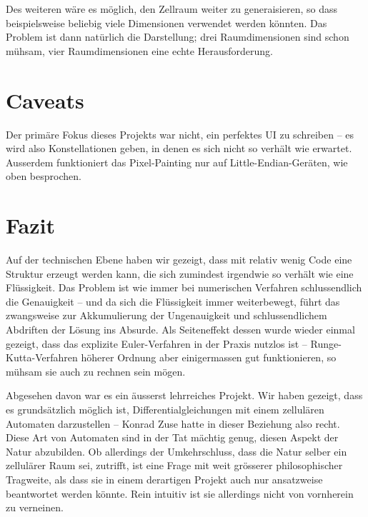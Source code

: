 \documentclass[11pt]{scrreprt} %
\theoremstyle{definition}
\begin{document}
Des weiteren wäre es möglich, den Zellraum weiter zu generaisieren, so dass beispielsweise beliebig viele Dimensionen verwendet werden könnten. Das Problem ist dann natürlich die Darstellung; drei Raumdimensionen sind schon mühsam, vier Raumdimensionen eine echte Herausforderung.

\section{Caveats}

Der primäre Fokus dieses Projekts war nicht, ein perfektes UI zu schreiben -- es wird also Konstellationen geben, in denen es sich nicht so verhält wie erwartet. Ausserdem funktioniert das Pixel-Painting nur auf Little-Endian-Geräten, wie oben besprochen.

\section{Fazit}

Auf der technischen Ebene haben wir gezeigt, dass mit relativ wenig Code eine Struktur erzeugt werden kann, die sich zumindest irgendwie so verhält wie eine Flüssigkeit. Das Problem ist wie immer bei numerischen Verfahren schlussendlich die Genauigkeit -- und da sich die Flüssigkeit immer weiterbewegt, führt das zwangsweise zur Akkumulierung der Ungenauigkeit und schlussendlichem Abdriften der Lösung ins Absurde. Als Seiteneffekt dessen wurde wieder einmal gezeigt, dass das explizite Euler-Verfahren in der Praxis nutzlos ist -- Runge-Kutta-Verfahren höherer Ordnung aber einigermassen gut funktionieren, so mühsam sie auch zu rechnen sein mögen.

Abgesehen davon war es ein äusserst lehrreiches Projekt. Wir haben gezeigt, dass es grundsätzlich möglich ist, Differentialgleichungen mit einem zellulären Automaten darzustellen -- Konrad Zuse hatte in dieser Beziehung also recht. Diese Art von Automaten sind in der Tat mächtig genug, diesen Aspekt der Natur abzubilden. Ob allerdings der Umkehrschluss, dass die Natur selber ein zellulärer Raum sei, zutrifft, ist eine Frage mit weit grösserer philosophischer Tragweite, als dass sie in einem derartigen Projekt auch nur ansatzweise beantwortet werden könnte. Rein intuitiv ist sie allerdings nicht von vornherein zu verneinen.



\end{document}
